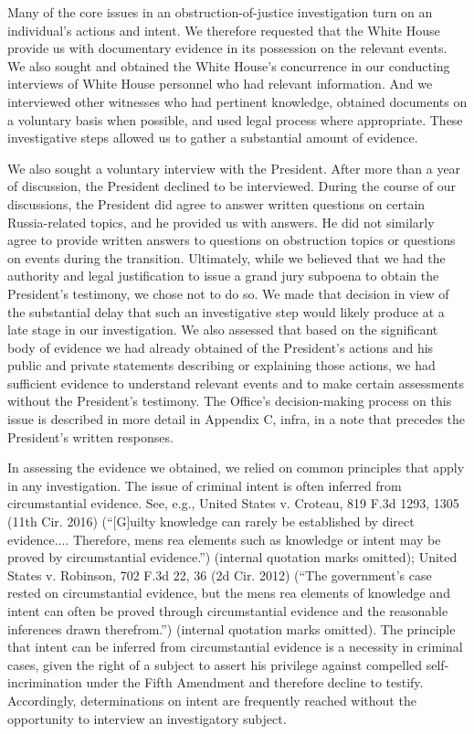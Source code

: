 Many of the core issues in an obstruction-of-justice investigation turn on an individual’s actions and intent. 
We therefore requested that the White House provide us with documentary evidence in its possession on the relevant events. 
We also sought and obtained the White House’s concurrence in our conducting interviews of White House personnel who had relevant information. 
And we interviewed other witnesses who had pertinent knowledge, obtained documents on a voluntary basis when possible, and used legal process where appropriate. 
These investigative steps allowed us to gather a substantial amount of evidence. 

We also sought a voluntary interview with the President. 
After more than a year of discussion, the President declined to be interviewed. 
During the course of our discussions, the President did agree to answer written questions on certain Russia-related topics, and he provided us with answers. 
He did not similarly agree to provide written answers to questions on obstruction topics or questions on events during the transition. 
Ultimately, while we believed that we had the authority and legal justification to issue a grand jury subpoena to obtain the President’s testimony, we chose not to do so. 
We made that decision in view of the substantial delay that such an investigative step would likely produce at a late stage in our investigation. 
We also assessed that based on the significant body of evidence we had already obtained of the President’s actions and his public and private statements describing or explaining those actions, we had sufficient evidence to understand relevant events and to make certain assessments without the President’s testimony. 
The Office’s decision-making process on this issue is described in more detail in Appendix C, infra, in a note that precedes the President’s written responses. 

In assessing the evidence we obtained, we relied on common principles that apply in any investigation. 
The issue of criminal intent is often inferred from circumstantial evidence. 
See, e.g., United States v. Croteau, 819 F.3d 1293, 1305 (11th Cir. 2016) (“[G]uilty knowledge can rarely be established by direct evidence.... 
Therefore, mens rea elements such as knowledge or intent may be proved by circumstantial evidence.”) (internal quotation marks omitted); 
United States v. Robinson, 702 F.3d 22, 36 (2d Cir. 2012) (“The government’s case rested on circumstantial evidence, but the mens rea elements of knowledge and intent can often be proved through circumstantial evidence and the reasonable inferences drawn therefrom.”) (internal quotation marks omitted). 
The principle that intent can be inferred from circumstantial evidence is a necessity in criminal cases, given the right of a subject to assert his privilege against compelled self-incrimination under the Fifth Amendment and therefore decline to testify. 
Accordingly, determinations on intent are frequently reached without the opportunity to interview an investigatory subject. 

